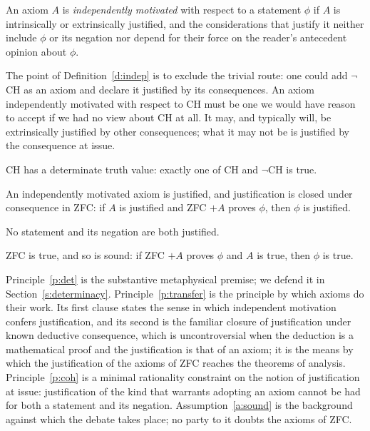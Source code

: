\documentclass{situationist-preprint}
\begin{document}
\begin{definition}\label{d:indep}
An axiom $A$ is \emph{independently motivated} with respect to a statement $\phi$ if $A$ is intrinsically or extrinsically justified, and the considerations that justify it neither include $\phi$ or its negation nor depend for their force on the reader's antecedent opinion about $\phi$.
\end{definition}

The point of Definition~\ref{d:indep} is to exclude the trivial route: one could add $\neg$CH as an axiom and declare it justified by its consequences. An axiom independently motivated with respect to CH must be one we would have reason to accept if we had no view about CH at all. It may, and typically will, be extrinsically justified by other consequences; what it may not be is justified by the consequence at issue.

\begin{principle}[Determinacy]\label{p:det}
CH has a determinate truth value: exactly one of CH and $\neg$CH is true.
\end{principle}

\begin{principle}[Transfer]\label{p:transfer}
An independently motivated axiom is justified, and justification is closed under consequence in ZFC: if $A$ is justified and ZFC $+ A$ proves $\phi$, then $\phi$ is justified.
\end{principle}

\begin{principle}[Coherence]\label{p:coh}
No statement and its negation are both justified.
\end{principle}

\begin{assumption}\label{a:sound}
ZFC is true, and so is sound: if ZFC $+ A$ proves $\phi$ and $A$ is true, then $\phi$ is true.
\end{assumption}

Principle~\ref{p:det} is the substantive metaphysical premise; we defend it in Section~\ref{s:determinacy}. Principle~\ref{p:transfer} is the principle by which axioms do their work. Its first clause states the sense in which independent motivation confers justification, and its second is the familiar closure of justification under known deductive consequence, which is uncontroversial when the deduction is a mathematical proof and the justification is that of an axiom; it is the means by which the justification of the axioms of ZFC reaches the theorems of analysis. Principle~\ref{p:coh} is a minimal rationality constraint on the notion of justification at issue: justification of the kind that warrants adopting an axiom cannot be had for both a statement and its negation. Assumption~\ref{a:sound} is the background against which the debate takes place; no party to it doubts the axioms of ZFC.
\end{document}
